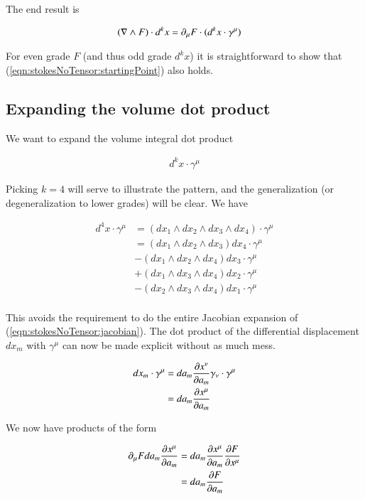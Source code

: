The end result is 

\begin{align}\label{eqn:stokesNoTensor:startingPoint}
( \grad \wedge F ) \cdot d^k x &= \partial_\mu F \cdot (d^k x \cdot \gamma^\mu) 
\end{align}

For even grade $F$ (and thus odd grade $d^k x$) it is straightforward to show that (\ref{eqn:stokesNoTensor:startingPoint}) also holds.

\subsection{Expanding the volume dot product}

We want to expand the volume integral dot product

\begin{align}
d^k x \cdot \gamma^\mu
\end{align}

Picking $k = 4$ will serve to illustrate the pattern, and the generalization (or degeneralization to lower grades) will be clear.  We have

\begin{align*}
d^4 x \cdot \gamma^\mu
&=
( dx_1 \wedge dx_2 \wedge dx_3 \wedge dx_4 ) \cdot \gamma^\mu \\
&= ( dx_1 \wedge dx_2 \wedge dx_3 ) dx_4 \cdot \gamma^\mu \\
&-( dx_1 \wedge dx_2 \wedge dx_4 ) dx_3 \cdot \gamma^\mu \\
&+( dx_1 \wedge dx_3 \wedge dx_4 ) dx_2 \cdot \gamma^\mu \\
&-( dx_2 \wedge dx_3 \wedge dx_4 ) dx_1 \cdot \gamma^\mu  \\
\end{align*}

This avoids the requirement to do the entire Jacobian expansion of (\ref{eqn:stokesNoTensor:jacobian}).  The dot product of the differential displacement $dx_m$ with $\gamma^\mu$ can now be made explicit without as much mess.

\begin{align*}
dx_m \cdot \gamma^\mu 
&=
da_m \PD{a_m}{x^\nu} \gamma_\nu \cdot \gamma^\mu \\
&=
da_m \PD{a_m}{x^\mu} \\
\end{align*}

We now have products of the form

\begin{align*}
\partial_\mu F da_m \PD{a_m}{x^\mu} 
&=
da_m \PD{a_m}{x^\mu} \PD{x^\mu}{F} \\
&=
da_m \PD{a_m}{F} \\
\end{align*}

